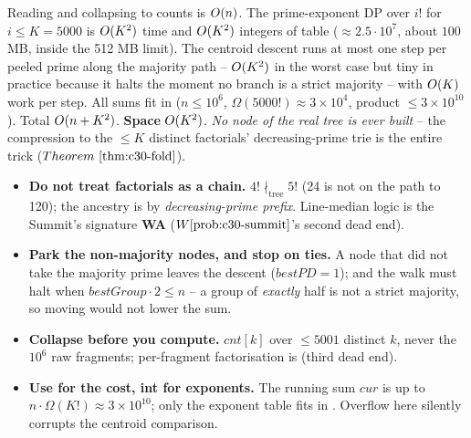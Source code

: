 \begin{complexitybox}
Reading and collapsing to counts is \(O(n)\). The prime-exponent DP over \(i!\) for
\(i\le K=5000\) is \(O(K^2)\) time and \(O(K^2)\) integers of table (\(\approx2.5\cdot10^7\),
about \(100\) MB, inside the 512 MB limit). The centroid descent runs at most one step per peeled
prime along the majority path -- \(O(K^2)\) in the worst case but tiny in practice because it
halts the moment no branch is a strict majority -- with \(O(K)\) work per step. All sums fit in
 (\(n\le10^6\), \(\Omega(5000!)\approx3\times10^4\), product \(\le3\times10^{10}\)).
Total \(O(n+K^2)\). \textbf{Space} \(O(K^2)\). \emph{No node of the real tree is ever
built} -- the compression to the \(\le K\) distinct factorials' decreasing-prime trie is the entire
trick (\(\thmref{c30-fold}\)).
\end{complexitybox}

\begin{hardeningbox}
\begin{itemize}[nosep,leftmargin=1.4em]
  \item \textbf{Do not treat factorials as a chain.} \(4!\nmid_{\text{tree}}5!\) (24 is not on the
        path to 120); the ancestry is by \emph{decreasing-prime prefix}. Line-median logic is the
        Summit's signature \textbf{WA} (\(\probref{c30-summit}\)'s second dead end).
  \item \textbf{Park the non-majority nodes, and stop on ties.} A node that did not take the
        majority prime leaves the descent (\(\mathit{bestPD}=1\)); and the walk must halt when
        \(\mathit{bestGroup}\cdot 2\le n\) -- a group of \emph{exactly} half is not a strict
        majority, so moving would not lower the sum.
  \item \textbf{Collapse before you compute.} \(\mathit{cnt}[k]\) over \(\le5001\) distinct \(k\),
        never the \(10^6\) raw fragments; per-fragment factorisation is \tle (third dead end).
  \item \textbf{Use  for the cost, int for exponents.} The running sum
        \(\mathit{cur}\) is up to \(n\cdot\Omega(K!)\approx3\times10^{10}\); only the exponent
        table fits in . Overflow here silently corrupts the centroid comparison.
\end{itemize}
\end{hardeningbox}

